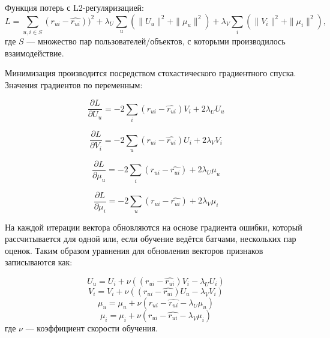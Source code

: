 Функция потерь с L2-регуляризацией:
\begin{equation}\label{eq:9}
        L = \sum_{u, i\in S}{(r_{ui} - \hat{r_{ui}})) ^ 2} + \lambda_{U}\sum_{u}{(\|U_{u}\| ^ 2 + \|\mu_{u}\| ^ 2)} + \lambda_{V}\sum_{i}{(\|V_{i}\| ^ 2 + \|\mu_{i}\| ^ 2)},
\end{equation}
где $S$ --- множество пар пользователей/объектов, с которыми производилось взаимодействие.

Минимизация производится посредством стохастического градиентного спуска.
Значения градиентов по переменным:

\begin{equation}\label{eq:10}
        \frac{\partial L}{\partial U_{u}} = -2\sum_{i}{(r_{ui} - \hat{r_{ui}})V_{i} + 2 \lambda_{U}U_{u}}
\end{equation}

\begin{equation}\label{eq:11}
        \frac{\partial L}{\partial V_{i}} = -2\sum_{u}{(r_{ui} - \hat{r_{ui}})U_{i} + 2 \lambda_{V}V_{i}}
\end{equation}

\begin{equation}\label{eq:12}
        \frac{\partial L}{\partial \mu_{u}} = -2\sum_{i}{(r_{ui} - \hat{r_{ui}}) + 2 \lambda_{U}\mu_{u}}
\end{equation}

\begin{equation}\label{eq:13}
        \frac{\partial L}{\partial \mu_{i}} = -2\sum_{u}{(r_{ui} - \hat{r_{ui}}) + 2 \lambda_{V}\mu_{i}}
\end{equation}

На каждой итерации вектора обновляются на основе градиента ошибки, который рассчитывается для одной или, если обучение ведётся батчами, нескольких пар оценок.
Таким образом уравнения для обновления векторов признаков записываются как:

\begin{equation}\label{eq:14}
        U_{u} = U_{i} + \nu ((r_{ui} - \hat{r_{ui}})V_{i} - \lambda_{U}U_{i})
\end{equation}
\begin{equation}\label{eq:15}
        V_{i} = V_{i} + \nu ((r_{ui} - \hat{r_{ui}})U_{u} - \lambda_{V}V_{i})
\end{equation}
\begin{equation}\label{eq:16}
        \mu_{u} = \mu_{u} + \nu (r_{ui} - \hat{r_{ui}} - \lambda_{U}\mu_{u})
\end{equation}
\begin{equation}\label{eq:17}
        \mu_{i} = \mu_{i} + \nu (r_{ui} - \hat{r_{ui}} - \lambda_{V}\mu_{i})
\end{equation}
где $\nu$ --- коэффициент скорости обучения.

